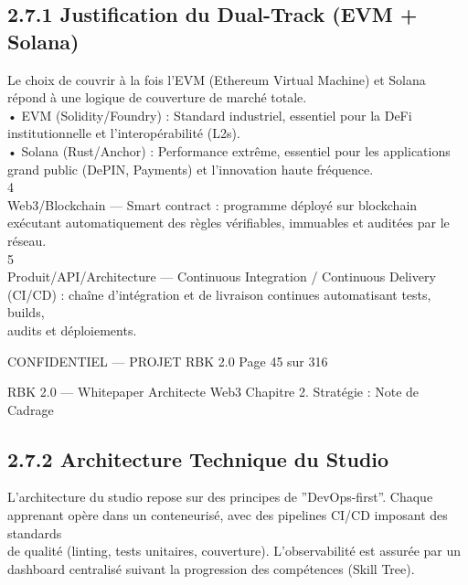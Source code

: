 \documentclass[12pt,landscape,a4paper]{article}
\newenvironment{confidential}
{\begin{tcolorbox}[
    colback=rbkred!5!white,
    colframe=rbkred!75!black,
    title=CONFIDENTIEL,
    fonttitle=\bfseries\color{white},
    coltitle=rbkred!75!black,
    breakable,
    enhanced,
    frame hidden,
    borderline west={2pt}{0pt}{rbkred!75!black}
]}
{\end{tcolorbox}}
\begin{document}
\subsection{2.7.1 Justification du Dual-Track (EVM + Solana)}
Le choix de couvrir à la fois l’EVM (Ethereum Virtual Machine) et Solana répond à une logique de couverture de marché totale.\\
• EVM (Solidity/Foundry) : Standard industriel, essentiel pour la DeFi institutionnelle et l’interopérabilité (L2s).\\
• Solana (Rust/Anchor) : Performance extrême, essentiel pour les applications grand public (DePIN, Payments) et l’innovation haute fréquence.\\
4\\
Web3/Blockchain — Smart contract : programme déployé sur blockchain exécutant automatiquement des règles vérifiables, immuables et auditées par le réseau.\\
5\\
Produit/API/Architecture — Continuous Integration / Continuous Delivery (CI/CD) : chaîne d’intégration et de livraison continues automatisant tests, builds,\\
audits et déploiements.\\
\vspace{0.5em}
\vspace{0.5em}
\vspace{0.5em}
\vspace{0.5em}
\begin{confidential}CONFIDENTIEL — PROJET RBK 2.0                                              Page 45 sur 316\end{confidential}
RBK 2.0 — Whitepaper Architecte Web3                                                                                      Chapitre 2. Stratégie : Note de Cadrage\\
\vspace{0.5em}
\vspace{0.5em}
\subsection{2.7.2 Architecture Technique du Studio}
L’architecture du studio repose sur des principes de ”DevOps-first”. Chaque apprenant opère dans un conteneurisé, avec des pipelines CI/CD imposant des standards\\
de qualité (linting, tests unitaires, couverture). L’observabilité est assurée par un dashboard centralisé suivant la progression des compétences (Skill Tree).\\
\vspace{0.5em}
\vspace{0.5em}
\vspace{0.5em}
\end{document}
